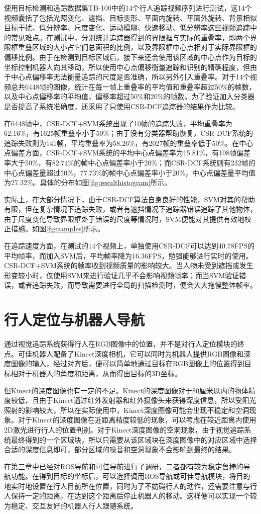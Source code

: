   使用目标检测和追踪数据集TB-100\cite{Wu2015Object}中的14个行人追踪视频序列进行测试，这14个视频囊括了包括光照变化、遮挡、目标变形、平面内旋转、平面外旋转、背景相似目标干扰、低分辨率、尺度变化、运动模糊、快速移动、低分辨率这些视频追踪中的常见难点。在测试中，分别统计追踪器得到的界限框与实际的重叠率，即两个界限框重叠区域的大小占它们总面积的比例，以及界限框中心点相对于实际界限框的偏移比例。由于在检测到目标区域后，接下来还会使用该区域的中心点作为目标的坐标控制机器人向其移动，所以使用中心点偏移衡量追踪和识别的精确程度，但由于中心点偏移率无法衡量追踪的尺度是否准确，所以另外引入重叠率。对于14个视频总共6448帧的图像，统计在每一帧上重叠率的平均值和重叠率超过50\%的帧数，以及中心点偏移率的平均值，偏移率超过50\%和20\%的帧数。为了验证加入分类器是否提高了系统准确度，还采用了只使用CSR-DCF追踪器的结果作为比较。

  在6448帧中，CSR-DCF+SVM系统出现了10帧的追踪失败，平均重叠率为62.16\%，有1625帧重叠率小于50\%；由于没有分类器帮助恢复，CSR-DCF系统的追踪失败则为141帧，平均重叠率为58.26\%，有2027帧的重叠率低于50\%。在中心点偏差方面，CSR-DCF+SVM系统的平均中心点偏差率为15.81\%，有108帧偏差率大于50\%，有82.74\%的帧中心点偏差率小于20\%；而CSR-DCF系统则有232帧的中心点偏差量超过50\%，77.73\%的帧中心点偏差率小于20\%，中心点偏差量平均值为27.32\%。具体的分布如图\ref{fig:resulthistogram}所示。


  实际上，在大部分情况下，由于CSR-DCF算法自身良好的性能，SVM对其的帮助有限，但在复杂情况下追踪失败，或者有遮挡情况下追踪器错误追踪了其他物体，由于尺度变化导致界限框处于错误的尺度等情况时，SVM便能对其提供有效地校正措施。如图\ref{fig:samples}所示。


  在追踪速度方面，在测试的14个视频上，单独使用CSR-DCF可以达到40.78FPS的平均帧率，而加入SVM后，平均帧率降为16.36FPS，勉强能够进行实时的使用。CSR-DCF+SVM系统的帧率收到视频质量的影响较大。当人物未受到遮挡或发生形变较小时，仅使用SVM来进行验证几乎不会影响视频帧率；而当SVM验证错误，或者追踪失败，而导致需要进行全局的扫描检测时，便会大大拖慢整体帧率。

\section{行人定位与机器人导航}

  通过视觉追踪系统获得行人在RGB图像中的位置，并不是对行人定位模块的终点。可佳机器人配备了Kinect深度相机，它可以同时为机器人提供RGB图像和深度图像的输入，经过对齐后，便可以简单地通过目标在RGB图像上的位置得到目标相对于机器人的角度和距离，从而得出目标的3D坐标。

  但Kinect的深度图像也有一定的不足。Kinect的深度图像对于80厘米以内的物体精度较低，且由于Kinect通过红外发射器和红外摄像头来获得深度信息，所以受阳光照射的影响较大，所以在实际使用中，Kinect深度图像可能会出现不稳定和空洞现象。对于Kinect的深度图像在近距离精度较低的现象，可以考虑在较近距离内使用2D激光进行行人的位置判别。对于Kinect深度图像的空洞现象，由于视觉追踪系统最终得到的一个区域块，所以只需要从该区域块在深度图像中的对应区域中选择合适的深度信息即可，部分区域的噪音和空洞现象不会影响到最终的结果。

  在第三章中已经对ROS导航和可佳导航进行了调研，二者都有较为稳定鲁棒的导航功能。在得到目标的坐标后，可以选择调用ROS导航或可佳导航模块，将目的地实时地设置在行人目前所在位置，同时为了不妨碍行人的动作，还需要注意与行人保持一定的距离，在达到这个距离后停止机器人的移动。这样便可以实现一个较为稳定、交互友好的机器人行人跟随系统。